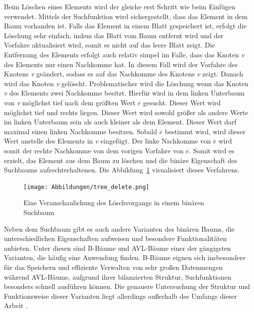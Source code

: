 Beim Löschen eines Elements wird der gleiche erst Schritt wie beim Einfügen verwendet. Mittels der Suchfunktion wird sichergestellt, dass das Element in dem Baum vorhanden ist. Falls das Element in einem Blatt gespeichert ist, erfolgt die Löschung sehr einfach, indem das Blatt vom Baum entfernt wird und der Vorfahre aktualisiert wird, somit es nicht auf das leere Blatt zeigt. Die Entfernung des Elements erfolgt auch relativ simpel im Falle, dass das Knoten \textit{v} des Elements nur einen Nachkomme hat. In diesem Fall wird der Vorfahre des Knotens \textit{v} geändert, sodass es auf das Nachkomme des Knotens \textit{v} zeigt. Danach wird das Knoten \textit{v} gelöscht. Problematischer wird die Löschung wenn das Knoten \textit{v} des Elements zwei Nachkomme besitzt. Hierfür wird in dem linken Unterbaum von \textit{v} möglichst tief nach dem größten Wert \textit{$\overline{e}$} gesucht. Dieser Wert wird möglichst tief und rechts liegen. Dieser Wert wird sowohl größer als andere Werte im linken Unterbaum sein als auch kleiner als dem Element. Dieser Wert darf maximal einen linken Nachkomme besitzen. Sobald \textit{$\overline{e}$} bestimmt wird, wird dieser Wert anstelle des Elements in \textit{v} eingefügt. Der linke Nachkomme von \textit{$\overline{e}$} wird somit der rechte Nachkomme von dem vorigen Vorfahre von \textit{$\overline{e}$}. Somit wird es erzielt, das Element aus dem Baum zu löschen und die binäre Eigenschaft des Suchbaums aufrechterhaltenen. Die Abbildung~\ref{fig: tree_delete} visualisiert dieses Verfahrens. \autocite[140-141]{knebl_algorithmen_2021}

\begin{figure}[!b]
	\texttt{[image: Abbildungen/tree\_delete.png]}
	\centering
	\caption[Löschvorgang binären Baums]{Eine Veranschaulichung des Löschvorgangs in einem binären Suchbaum \autocite[140]{knebl_algorithmen_2021}}
	\label{fig: tree_delete}
\end{figure}

Neben dem Suchbaum gibt es auch andere Varianten des binären Baums, die unterschiedlichen Eigenschaften aufweisen und besondere Funktionalitäten anbieten. Unter diesen sind B-Bäume und AVL-Bäume einer der gängigsten Varianten, die häufig eine Anwendung finden. B-Bäume eignen sich insbesondere für das Speichern und effiziente Verwalten von sehr großen Datenmengen während AVL-Bäume, aufgrund ihrer bilanzierten Struktur, Suchfunktionen besonders schnell ausführen können. Die genauere Untersuchung der Struktur und Funktionsweise dieser Varianten liegt allerdings außerhalb des Umfangs dieser Arbeit \autocite[407-412]{gumm_band_2016}.

